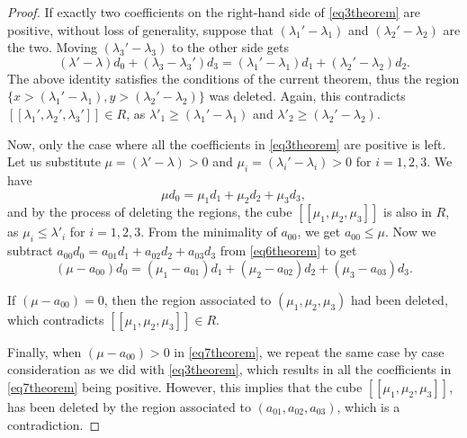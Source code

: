 \documentclass[10pt,a4paper]{amsart}
\begin{document}
\begin{proof}
If exactly two coefficients on the right-hand side of \eqref{eq3theorem} are positive, without loss of generality, suppose that $(\lambda_1' - \lambda_1)$ and $(\lambda_2' - \lambda_2)$ are the two. Moving $(\lambda_3' - \lambda_3)$ to the other side gets
    \begin{equation}\label{eq5theorem}
        (\lambda' - \lambda)d_0  + (\lambda_3 - \lambda_3')d_3= (\lambda_1' - \lambda_1)d_1  + (\lambda_2' - \lambda_2)d_2.
    \end{equation}
The above identity satisfies the conditions of the current theorem, thus the region $\{x > (\lambda_1' - \lambda_1), y > (\lambda_2' - \lambda_2)\}$ was deleted. Again, this contradicts $[[\lambda_1',\lambda_2',\lambda_3']] \in R$, as $\lambda'_1 \geq (\lambda_1' - \lambda_1)$ and $\lambda'_2 \geq (\lambda_2' - \lambda_2)$.

Now, only the case where all the coefficients in \eqref{eq3theorem} are positive is left. Let us substitute $\mu =(\lambda' - \lambda)  > 0$ and $\mu_i =(\lambda_i' - \lambda_i)  >0$ for $i = 1,2,3$. We have
    \begin{equation}\label{eq6theorem}
         \mu d_0 = \mu_1d_1 + \mu_2d_2 + \mu_3d_3,
    \end{equation}
and by the process of deleting the regions, the cube $[[\mu_1,\mu_2,\mu_3]]$ is also in $R$, as $\mu_i \leq \lambda'_i$ for $i = 1,2,3$. 
From the minimality of $a_{00}$, we get $a_{00} \leq \mu$. Now we subtract $a_{00}d_0 = a_{01}d_1 + a_{02}d_2 + a_{03}d_3$ from \eqref{eq6theorem} to get
\begin{equation}\label{eq7theorem}
    (\mu - a_{00}) d_0 = (\mu_1 - a_{01})d_1 +  (\mu_2 - a_{02})d_2 + (\mu_3 - a_{03})d_3.
\end{equation}
    
If $(\mu - a_{00}) = 0$, then 
the region associated to $(\mu_1,\mu_2,\mu_3)$ had been deleted, which contradicts $[[\mu_1,\mu_2,\mu_3]] \in R$. 

Finally, when $(\mu - a_{00}) > 0$ in \eqref{eq7theorem}, we repeat the same case by case consideration as we did with \eqref{eq3theorem}, which results in all the coefficients in \eqref{eq7theorem} being positive. However, this implies that the cube $[[\mu_1,\mu_2,\mu_3]]$, has been deleted by the region associated to $(a_{01}, a_{02}, a_{03})$, which is a contradiction. 
\end{proof}
\end{document}
